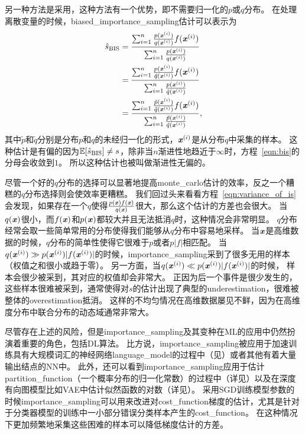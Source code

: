 另一种方法是采用，这种方法有一个优势，即不需要归一化的$p$或$q$分布。
在处理离散变量的时候，\gls{biased_importance_sampling}估计可以表示为
\begin{align}
\label{eqn:bis}
\hat{s}_{\text{BIS}} & = \frac{\sum_{i=1}^{n} \frac{p(\boldsymbol{\mathit{x}}^{(i)})}{q(\boldsymbol{\mathit{x}}^{(i)})} f(\boldsymbol{\mathit{x}}^{(i)})}{\sum_{i=1}^{n}\frac{p(\boldsymbol{\mathit{x}}^{(i)})}{q(\boldsymbol{\mathit{x}}^{(i)})}} \\
& = \frac{\sum_{i=1}^{n} \frac{p(\boldsymbol{\mathit{x}}^{(i)})}{\tilde{q}(\boldsymbol{\mathit{x}}^{(i)})} f(\boldsymbol{\mathit{x}}^{(i)})}{\sum_{i=1}^{n}\frac{p(\boldsymbol{\mathit{x}}^{(i)})}{\tilde{q}(\boldsymbol{\mathit{x}}^{(i)})}} \\
& = \frac{\sum_{i=1}^{n} \frac{\tilde{p}(\boldsymbol{\mathit{x}}^{(i)})}{\tilde{q}(\boldsymbol{\mathit{x}}^{(i)})} f(\boldsymbol{\mathit{x}}^{(i)})}{\sum_{i=1}^{n}\frac{\tilde{p}(\boldsymbol{\mathit{x}}^{(i)})}{\tilde{q}(\boldsymbol{\mathit{x}}^{(i)})}},
\end{align}
其中$\tilde{p}$和$\tilde{q}$分别是分布${p}$和${q}$的未经归一化的形式，$\boldsymbol{\mathit{x}}^{(i)}$是从分布${q}$中采集的样本。
这种估计是有偏的因为$\mathbb{E}[\hat{s}_{\text{BIS}}]\neq s$，除非当$n$渐进性地趋近于$\infty$时，方程~\eqref{eqn:bis}的分母会收敛到$1$。
所以这种估计也被叫做渐进性无偏的。


尽管一个好的$q$分布的选择可以显著地提高\gls{monte_carlo}估计的效率，反之一个糟糕的$q$分布选择则会使效率更糟糕。
我们回过头来看看方程~\eqref{eqn:variance_of_is}会发现，如果存在一个$q$使得$\frac{p(\boldsymbol{\mathit{x}})f(\boldsymbol{\mathit{x}})}{q(\boldsymbol{\mathit{x}})}$很大，那么这个估计的方差也会很大。
当$q(\boldsymbol{\mathit{x}})$很小，而$f(\boldsymbol{\mathit{x}})$和$p(\boldsymbol{\mathit{x}})$都较大并且无法抵消$q$时，这种情况会非常明显。
$q$分布经常会取一些简单常用的分布使得我们能够从$q$分布中容易地采样。
当$\boldsymbol{\mathit{x}}$是高维数据的时候，$q$分布的简单性使得它很难于$p$或者$p\vert f\vert$相匹配。
当$q(\boldsymbol{\mathit{x}}^{(i)})\gg p(\boldsymbol{\mathit{x}}^{(i)}) \vert f(\boldsymbol{\mathit{x}}^{(i)})\vert $的时候，\gls{importance_sampling}采到了很多无用的样本（权值之和很小或趋于零）。
另一方面，当$q(\boldsymbol{\mathit{x}}^{(i)})\ll p(\boldsymbol{\mathit{x}}^{(i)}) \vert f(\boldsymbol{\mathit{x}}^{(i)})\vert $的时候， 样本会很少被采到，其对应的权值却会非常大。
正因为后一个事件是很少发生的，这些样本很难被采到，通常使得对$s$的估计出现了典型的\gls{underestimation}，很难被整体的\gls{overestimation}抵消。
这样的不均匀情况在高维数据屡见不鲜，因为在高维度分布中联合分布的动态域通常非常大。


尽管存在上述的风险，但是\gls{importance_sampling}及其变种在\gls{ML}的应用中仍然扮演着重要的角色，包括\gls{DL}算法。
比方说，\gls{importance_sampling}被应用于加速训练具有大规模词汇的神经网络\gls{language_model}的过程中（见）或者其他有着大量输出结点的\gls{NN}中。
此外，还可以看到\gls{importance_sampling}应用于估计\gls{partition_function}（一个概率分布的归一化常数）的过程中（详见）以及在深度有向图模型比如\gls{VAE}中估计似然函数的对数（详见）。
采用\gls{SGD}训练模型参数的时候\gls{importance_sampling}可以用来改进对\gls{cost_function}梯度的估计，尤其是针对于分类器模型的训练中一小部分错误分类样本产生的\gls{cost_function}。
在这种情况下更加频繁地采集这些困难的样本可以降低梯度估计的方差\citep{Hinton06}。


